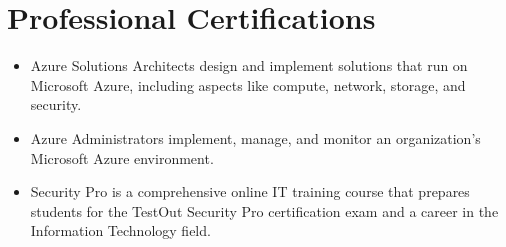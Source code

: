 \section{\color{black}Professional Certifications}
\resumeSubHeadingListStart
\color{black}
\begin{itemize}
\color{black}\item Azure Solutions Architects design and implement solutions that run on Microsoft Azure, including aspects like compute, network, storage, and security.
\end{itemize}
\begin{itemize}
    \color{black}\item Azure Administrators implement, manage, and monitor an organization’s Microsoft Azure environment.
\end{itemize} 
\begin{itemize}
    \color{black}\item Security Pro is a comprehensive online IT training course that prepares students for the TestOut Security Pro certification exam and a career in the Information Technology field.
\end{itemize}

\resumeSubHeadingListEnd